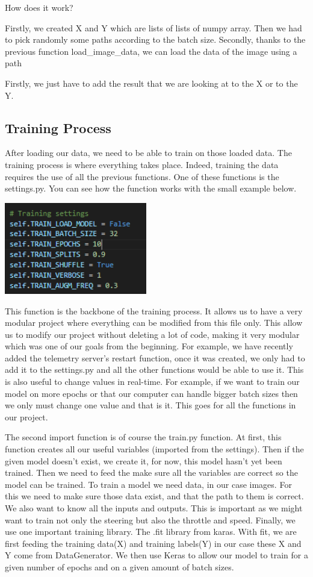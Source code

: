 \documentclass[12pt]{article}
\begin{document}
How does it work?  

Firstly, we created X and Y which are lists of lists of numpy array. Then we had to pick randomly some paths according to the batch size. Secondly, thanks to the previous function load\_image\_data, we can load the data of the image using a path

Firstly, we just have to add the result that we are looking at to the X or to the Y.

\subsection{Training Process}

After loading our data, we need to be able to train on those loaded data. The training process is where everything takes place. Indeed, training the data requires the use of all the previous functions. One of these functions is the settings.py. You can see how the function works with the small example below.

\centerline{\includegraphics[height=4cm]{../../docs/setting-train.png}}

This function is the backbone of the training process. It allows us to have a very modular project where everything can be modified from this file only. This allow us to modify our project without deleting a lot of code, making it very modular which was one of our goals from the beginning. For example, we have recently added the telemetry server's restart function, once it was created, we only had to add it to the settings.py and all the other functions would be able to use it.   
This is also useful to change values in real-time. For example, if we want to train our model on more epochs or that our computer can handle bigger batch sizes then we only must change one value and that is it. This goes for all the functions in our project. 

The second import function is of course the train.py function. At first, this function creates all our useful variables (imported from the settings). Then if the given model doesn’t exist, we create it, for now, this model hasn’t yet been trained.  Then we need to feed the make sure all the variables are correct so the model can be trained.  To train a model we need data, in our case images. For this we need to make sure those data exist, and that the path to them is correct.  
We also want to know all the inputs and outputs. This is important as we might want to train not only the steering but also the throttle and speed.  
Finally, we use one important training library. The .fit library from karas. With fit, we are first feeding the training data(X) and training labels(Y) in our case these X and Y come from DataGenerator. We then use Keras to allow our model to train for a given number of epochs and on a given amount of batch sizes. 
\end{document}
